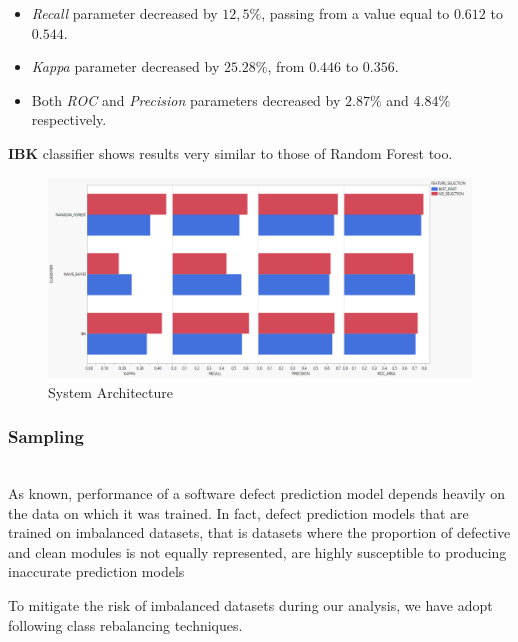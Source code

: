 \documentclass[sigconf]{acmart}
\begin{document}
\begin{itemize}
\item \textit{Recall} parameter decreased by $12,5\%$, passing from a value equal to $0.612$ to $0.544$. 
\item \textit{Kappa} parameter decreased by $25.28\%$, from $0.446$ to $0.356$. 
\item Both \textit{ROC} and \textit{Precision} parameters decreased by $2.87\%$ and $4.84\%$ respectively.
\end{itemize}

\textbf{IBK} classifier shows results very similar to those of Random Forest too.

\begin{figure}[h]
  \centering
  \includegraphics[width=\linewidth]{1 - BOOKKEEPER - FeatureSelectionWithoutSampling.png}
  \caption{System Architecture}
  \label{fig:BOOKKEEPER:FeatureSelectionWithoutSampling}
\end{figure}

\subsubsection{Sampling}
\hfill\\

As known, performance of a software defect prediction model depends heavily on the data on which it was trained. In fact, defect prediction models that are trained on imbalanced datasets, that is datasets where the proportion of defective and clean modules is not equally represented, are highly susceptible to producing inaccurate prediction models \cite{FalessiSampling}

To mitigate the risk of imbalanced datasets during our analysis, we have adopt following class rebalancing techniques.
\end{document}
